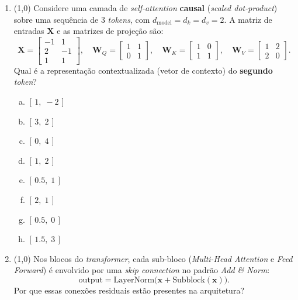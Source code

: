 \documentclass[11pt,a4paper]{article}
\begin{document}
\begin{enumerate}[1)]

\item (1{,}0) Considere uma camada de \textit{self-attention} \textbf{causal} (\textit{scaled dot-product}) sobre uma sequência de 3 \textit{tokens}, com $d_\text{model} = d_k = d_v = 2$. A matriz de entradas $\mathbf{X}$ e as matrizes de projeção são:
\[
\mathbf{X} = \begin{bmatrix} -1 & 1 \\ 2 & -1 \\ 1 & 1 \end{bmatrix},
\quad
\mathbf{W}_Q = \begin{bmatrix} 1 & 1 \\ 0 & 1 \end{bmatrix},
\quad
\mathbf{W}_K = \begin{bmatrix} 1 & 0 \\ 1 & 1 \end{bmatrix},
\quad
\mathbf{W}_V = \begin{bmatrix} 1 & 2 \\ 2 & 0 \end{bmatrix}.
\]
Qual é a representação contextualizada (vetor de contexto) do \textbf{segundo} \textit{token}?

\begin{enumerate}[a)]
    \item $[\,1,\;-2\,]$
    \item $[\,3,\;2\,]$
    \item $[\,0,\;4\,]$
    \item $[\,1,\;2\,]$
    \item $[\,0.5,\;1\,]$
    \item $[\,2,\;1\,]$
    \item $[\,0.5,\;0\,]$
    \item $[\,1.5,\;3\,]$
\end{enumerate}
\pagebreak

\item (1{,}0) Nos blocos do \textit{transformer}, cada sub-bloco (\textit{Multi-Head Attention} e \textit{Feed Forward}) é envolvido por uma \textit{skip connection} no padrão \textit{Add \& Norm}:
\[
\text{output} = \mathrm{LayerNorm}\bigl(\mathbf{x} + \mathrm{Subblock}(\mathbf{x})\bigr).
\]
Por que essas conexões residuais estão presentes na arquitetura?


\end{enumerate}
\end{document}
